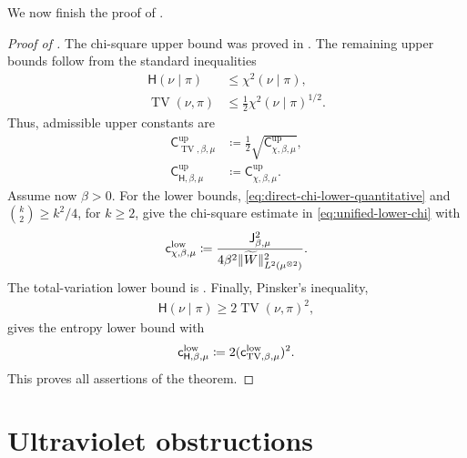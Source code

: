 \documentclass[11pt,reqno]{amsart}
\numberwithin{equation}{section}
\theoremstyle{plain}
\theoremstyle{remark}
\DeclarePairedDelimiter{\pa}{\lparen}{\rparen}
\DeclarePairedDelimiter{\norm}{\lVert}{\rVert}
\newcommand{\tl}{\widetilde}
\newcommand{\Hr}{{\mathsf{H}}}
\newcommand{\be}{\beta}
\newcommand{\Chi}{\chi^2}
\newcommand{\TV}{\operatorname{TV}}
\begin{document}
We now finish the proof of .

\begin{proof}[Proof of ]
The chi-square upper bound was proved in
.  The remaining upper bounds follow
from the standard inequalities
\begin{align}
 \Hr(\nu\mid\pi)&\le \Chi(\nu\mid\pi),
 \label{eq:entropy-upper-by-chi}\\
 \TV(\nu,\pi)&\le \frac12\Chi(\nu\mid\pi)^{1/2}.
 \label{eq:TV-upper-by-chi}
\end{align}
Thus, admissible upper constants are
\begin{align}
 \mathsf C_{\TV,\be,\mu}^{\mathrm{up}}
 &\coloneqq \frac12\sqrt{\mathsf C_{\chi,\be,\mu}^{\mathrm{up}}},
 \label{eq:C-TV-upper-def}\\
 \mathsf C_{\Hr,\be,\mu}^{\mathrm{up}}
 &\coloneqq \mathsf C_{\chi,\be,\mu}^{\mathrm{up}}.
 \label{eq:C-H-upper-def}
\end{align}
Assume now \(\be>0\).  For the lower bounds,
\eqref{eq:direct-chi-lower-quantitative} and
\(\binom{k}{2}\ge k^2/4\), for \(k\ge2\), give the chi-square estimate in
\eqref{eq:unified-lower-chi} with
\begin{align}\label{eq:c-chi-low-direct-def}
 \mathsf c_{\chi,\be,\mu}^{\mathrm{low}}
 \coloneqq
 \frac{\mathsf J_{\be,\mu}^2}
 {4\be^2\norm{\tl W}_{L^2(\mu^{\otimes2})}^2}.
\end{align}
The total-variation lower bound is .  Finally, Pinsker's
inequality,
\begin{align}\label{eq:pinsker-lower-entropy}
 \Hr(\nu\mid\pi)\ge 2\TV(\nu,\pi)^2,
\end{align}
gives the entropy lower bound with
\begin{align}\label{eq:c-H-low-def}
 \mathsf c_{\Hr,\be,\mu}^{\mathrm{low}}
 \coloneqq 2\pa{\mathsf c_{\TV,\be,\mu}^{\mathrm{low}}}^2.
\end{align}
This proves all assertions of the theorem.
\end{proof}

\section{Ultraviolet obstructions}
\label{sec:uv-sharpness-counterexamples}
\end{document}
